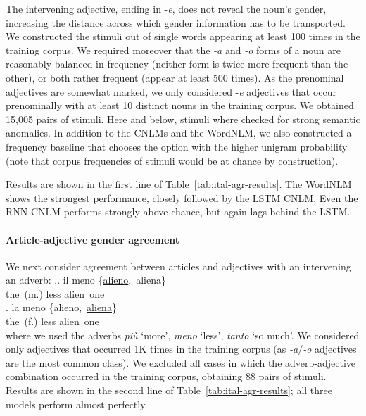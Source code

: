 The intervening adjective, ending in -\emph{e}, does not reveal the
noun's gender, increasing the distance across which gender information
has to be transported. We constructed the stimuli out of single words
appearing at least 100 times in the training corpus. We required
moreover that the \emph{-a} and \emph{-o} forms of a noun are
reasonably balanced in frequency (neither form is twice more frequent
than the other), or both rather frequent (appear at least 500
times). As the prenominal adjectives are somewhat marked, we only
considered -\emph{e} adjectives that occur prenominally with at least
10 distinct nouns in the training corpus. We obtained 15,005 pairs of stimuli.
Here and below, stimuli
where checked for strong semantic anomalies.
In addition to the CNLMs and the WordNLM, we also constructed a frequency baseline that chooses the option with the higher unigram probability (note that corpus frequencies of stimuli would be at chance by construction).

Results are shown in the first line of
Table~\ref{tab:ital-agr-results}.  The WordNLM shows the strongest
performance, closely followed by the LSTM CNLM.  Even the RNN CNLM
performs strongly above chance, but again lags behind the LSTM.

\paragraph{Article-adjective gender agreement}
We next consider agreement between articles and adjectives with an intervening an adverb:
\ex.\ag. il meno \{\underline{alieno},\ aliena\} \\
the\ (m.) less alien\ one \\
\bg. la meno \{alieno,\ \underline{aliena}\} \\
the\ (f.) less alien\ one \\

where we used the adverbs \emph{pi{\`u}} `more', \emph{meno} `less',
\emph{tanto} `so much'. We considered only adjectives that occurred 1K
times in the training corpus (as \emph{-a}/\emph{-o} adjectives are
the most common class). We excluded all cases in which the
adverb-adjective combination occurred in the training corpus, obtaining 88 pairs of stimuli. %
Results are shown in the second line of Table~\ref{tab:ital-agr-results}; all three models perform almost perfectly.

